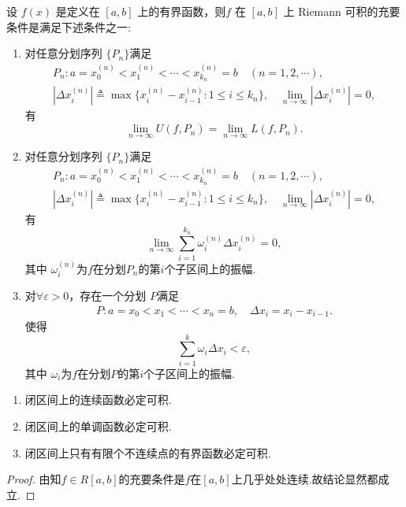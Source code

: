 \documentclass[../../main.tex]{subfiles}%
\begin{document}
\begin{theorem}[Riemann可积的充要条件]\label{theorem:Riemann可积的充要条件}
设 $f(x)$ 是定义在 $[a,b]$ 上的有界函数，则$f$ 在 $[a,b]$ 上 Riemann 可积的充要条件是满足下述条件之一:
\begin{enumerate}[(1)]
\item\label{theorem:Riemann可积的充要条件-1} 对任意分划序列 $\{P_n\}$满足
\begin{gather*}
P_n : a = x_0^{(n)} < x_1^{(n)} < \cdots < x_{k_n}^{(n)} = b \quad (n = 1,2,\cdots),
\\
|\Delta x_i^{(n)}| \triangleq \max \{ x_i^{(n)} - x_{i - 1}^{(n)} : 1 \leqslant i \leqslant k_n \}, \quad \lim_{n \to \infty} |\Delta x_i^{(n)}| = 0,
\end{gather*}
有
\[
\lim_{n\to\infty} U(f,P_n) = \lim_{n\to\infty} L(f,P_n).
\]

\item\label{theorem:Riemann可积的充要条件-2} 对任意分划序列 $\{P_n\}$满足
\begin{gather*}
P_n : a = x_0^{(n)} < x_1^{(n)} < \cdots < x_{k_n}^{(n)} = b \quad (n = 1,2,\cdots),
\\
|\Delta x_i^{(n)}| \triangleq \max \{ x_i^{(n)} - x_{i - 1}^{(n)} : 1 \leqslant i \leqslant k_n \}, \quad \lim_{n \to \infty} |\Delta x_i^{(n)}| = 0,
\end{gather*}
有
\[
\lim_{n\to\infty} \sum_{i=1}^{k_n} \omega_i^{(n)} \Delta x_i^{(n)} = 0,
\]
其中 $\omega_i^{(n)}$为$f$在分划$P_n$的第$i$个子区间上的振幅.

\item\label{theorem:Riemann可积的充要条件-3} 对$\forall \varepsilon > 0$，存在一个分划 $P$满足
\begin{gather*}
P : a = x_0 < x_1 < \cdots < x_n = b,\quad \Delta x_i=x_i-x_{i-1}.
\end{gather*}
使得
\[
\sum_{i=1}^{k} \omega_i \Delta x_i < \varepsilon,
\]
其中 $\omega_i$为$f$在分划$P$的第$i$个子区间上的振幅.
\end{enumerate}
\end{theorem}

\begin{proposition}[常见的可积函数]\label{proposition:常见的可积函数}
\begin{enumerate}
\item 闭区间上的连续函数必定可积.

\item 闭区间上的单调函数必定可积.

\item 闭区间上只有有限个不连续点的有界函数必定可积.
\end{enumerate}
\end{proposition}
\begin{proof}
由知$f\in R[a,b]$的充要条件是$f$在$[a,b]$上几乎处处连续.故结论显然都成立.
\end{proof}
\end{document}
